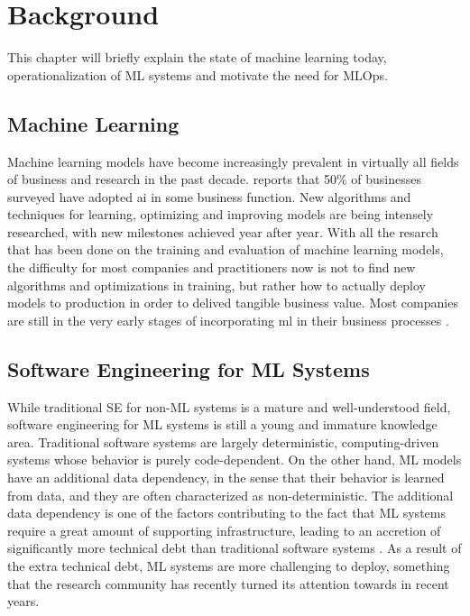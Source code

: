 \chapter{Background}
\label{ch:background}
This chapter will briefly explain the state of machine learning today, operationalization of ML systems and motivate the need for MLOps.

\section{Machine Learning}
Machine learning models have become increasingly prevalent in virtually all fields of business and research in the past decade.
\textcite{mckinsey2020} reports that 50\% of businesses surveyed have adopted \acrshort{ai} in some business function.
New algorithms and techniques for learning, optimizing and improving models are being intensely researched, with new milestones achieved year after year.
With all the resarch that has been done on the training and evaluation of machine learning models, the difficulty for most companies and practitioners now is not to find new algorithms and optimizations in training, but rather how to actually deploy models to production in order to delived tangible business value.
Most companies are still in the very early stages of incorporating \acrshort{ml} in their business processes \cite{Schloegl2019}.

\section{Software Engineering for ML Systems}
While traditional SE for non-ML systems is a mature and well-understood field, software engineering for ML systems is still a young and immature knowledge area.
Traditional software systems are largely deterministic, computing-driven systems whose behavior is purely code-dependent.
On the other hand, ML models have an additional data dependency, in the sense that their behavior is learned from data, and they are often characterized as non-deterministic.
The additional data dependency is one of the factors contributing to the fact that ML systems require a great amount of supporting infrastructure, leading to an accretion of significantly more technical debt than traditional software systems \cite{Sculley2015}.
As a result of the extra technical debt, ML systems are more challenging to deploy, something that the research community has recently turned its attention towards in recent years.

